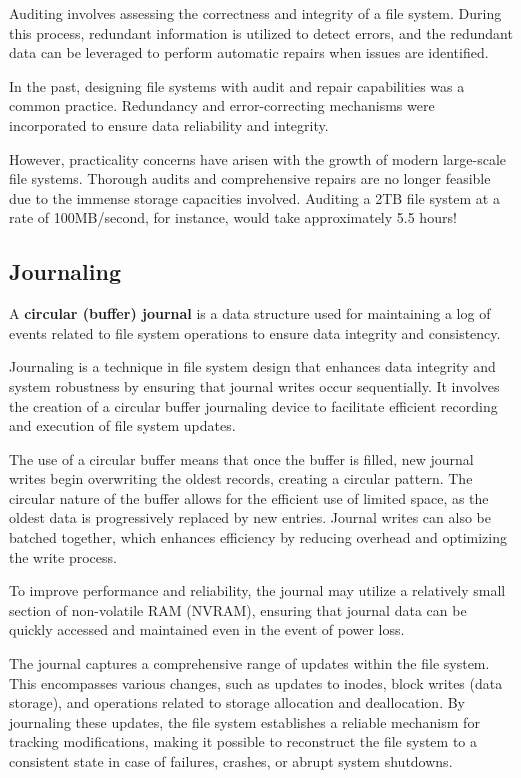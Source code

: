 \documentclass{report}
\newcommand{\definitionBegin}[1]{\begin{tcolorbox}[title={Definition: #1}]}
\newcommand{\definitionEnd}{\end{tcolorbox}}
\newcommand{\asideBegin}[1]{\begin{tcolorbox}[colback=orange!5!white,colframe=black!75!orange,title={Aside:
      #1}]}
\newcommand{\asideEnd}{\end{tcolorbox}}
\begin{document}
Auditing involves assessing the correctness and integrity of a file system. During this process,
redundant information is utilized to detect errors, and the redundant data can be leveraged to
perform automatic repairs when issues are identified.

\asideBegin{Practicality}
In the past, designing file systems with audit and repair capabilities was a common
practice. Redundancy and error-correcting mechanisms were incorporated to ensure data reliability
and integrity.

However, practicality concerns have arisen with the growth of modern large-scale file
systems. Thorough audits and comprehensive repairs are no longer feasible due to the immense storage
capacities involved. Auditing a 2TB file system at a rate of 100MB/second, for instance, would take
approximately 5.5 hours!
\asideEnd


\subsection{Journaling}
\definitionBegin{Circular Journal}
A \textbf{circular (buffer) journal} is a data structure used for maintaining a log of events
related to file system operations to ensure data integrity and consistency.
\definitionEnd

Journaling is a technique in file system design that enhances data integrity and system robustness
by ensuring that journal writes occur sequentially. It involves the creation of a circular buffer
journaling device to facilitate efficient recording and execution of file system updates.

The use of a circular buffer means that once the buffer is filled, new journal writes begin
overwriting the oldest records, creating a circular pattern. The circular nature of the buffer
allows for the efficient use of limited space, as the oldest data is progressively replaced by new
entries. Journal writes can also be batched together, which enhances efficiency by reducing overhead
and optimizing the write process.

To improve performance and reliability, the journal may utilize a relatively small section of
non-volatile RAM (NVRAM), ensuring that journal data can be quickly accessed and maintained even in
the event of power loss.

The journal captures a comprehensive range of updates within the file system. This encompasses
various changes, such as updates to inodes, block writes (data storage), and operations related to
storage allocation and deallocation. By journaling these updates, the file system establishes a
reliable mechanism for tracking modifications, making it possible to reconstruct the file system to
a consistent state in case of failures, crashes, or abrupt system shutdowns.
\end{document}
